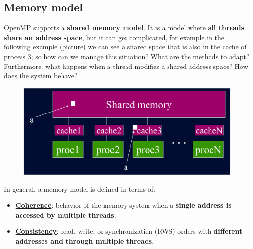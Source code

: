 \subsection{Memory model}

OpenMP supports a \textbf{shared memory model}. It is a model where \textbf{all threads share an address space}, but it can get complicated, for example in the following example (picture) we can see a shared space that is also in the cache of process 3; so how can we manage this situation? What are the methods to adapt? Furthermore, what happens when a thread modifies a shared address space? How does the system behave?

\begin{figure}[!htp]
    \centering
    \includegraphics[width=.8\textwidth]{img/memory-model-1.pdf}
\end{figure}

\noindent
In general, a memory model is defined in terms of:
\begin{itemize}
    \item \textbf{\underline{Coherence}}: behavior of the memory system when a \textbf{single address is accessed by multiple threads}.
    \item \textbf{\underline{Consistency}}: read, write, or synchronization (RWS) orders with \textbf{different addresses and through multiple threads}.
\end{itemize}

